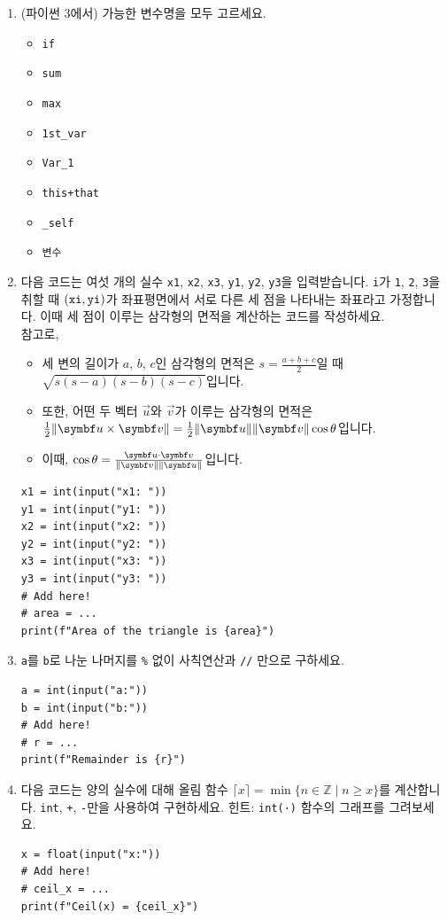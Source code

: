 \documentclass[../main.tex]{subfiles}
\begin{document}
\begin{enumerate}
  \item (파이썬 3에서) 가능한 변수명을 모두 고르세요.
    \begin{itemize}
      \item \verb/if/
      \item \verb/sum/
      \item \verb/max/
      \item \verb/1st_var/
      \item \verb/Var_1/
      \item \verb/this+that/
      \item \verb/_self/
      \item \verb/변수/
    \end{itemize}

  \item 다음 코드는 여섯 개의 실수 \verb|x1|, \verb|x2|, \verb|x3|, \verb|y1|, \verb|y2|, \verb|y3|을 입력받습니다.
    \verb|i|가 \verb|1|, \verb|2|, \verb|3|을 취할 때 $(\verb|xi|,
    \verb|yi|)$가 좌표평면에서 서로 다른 세 점을 나타내는 좌표라고 가정합니다.
    이때 세 점이 이루는 삼각형의 면적을 계산하는 코드를 작성하세요.\\
    참고로,
    \begin{itemize}
      \small
      \item 세 변의 길이가 $a$, $b$, $c$인 삼각형의 면적은 $s = \frac{a + b +
        c}{2}$일 때 $\sqrt{s(s - a)(s - b)(s - c)}$입니다.
      \item 또한, 어떤 두 벡터 $\vec{u}$와 $\vec{v}$가 이루는 삼각형의 면적은
        $\frac12 \norm{\vec{u} \times \vec{v}} = \frac12 \norm{\vec{u}}
        \norm{\vec{v}} \cos \theta$입니다.
      \item 이때, $\cos \theta = \frac{\vec{u} \cdot \vec{v}}{\norm{\vec{v}}
    \norm{\vec{u}}}$입니다.
    \end{itemize}
    \begin{verbatim}
x1 = int(input("x1: "))
y1 = int(input("y1: "))
x2 = int(input("x2: "))
y2 = int(input("y2: "))
x3 = int(input("x3: "))
y3 = int(input("y3: "))
# Add here!
# area = ...
print(f"Area of the triangle is {area}")
    \end{verbatim}

  \item \verb|a|를 \verb|b|로 나눈 나머지를 \verb|%| 없이 사칙연산과 \verb|//|
  만으로 구하세요.
    \begin{verbatim}
a = int(input("a:"))
b = int(input("b:"))
# Add here!
# r = ...
print(f"Remainder is {r}")
    \end{verbatim}

  \item 다음 코드는 양의 실수에 대해 올림 함수 $\lceil x \rceil = \min \{n \in \mathbb{Z} \mid n \geq x\}$를 계산합니다.
    \verb|int|, \verb|+|, \verb|-|만을 사용하여 구현하세요.%
    힌트: \verb|int(·)| 함수의 그래프를 그려보세요.
    \begin{verbatim}
x = float(input("x:"))
# Add here!
# ceil_x = ...
print(f"Ceil(x) = {ceil_x}")
    \end{verbatim}
\end{enumerate}
\end{document}
